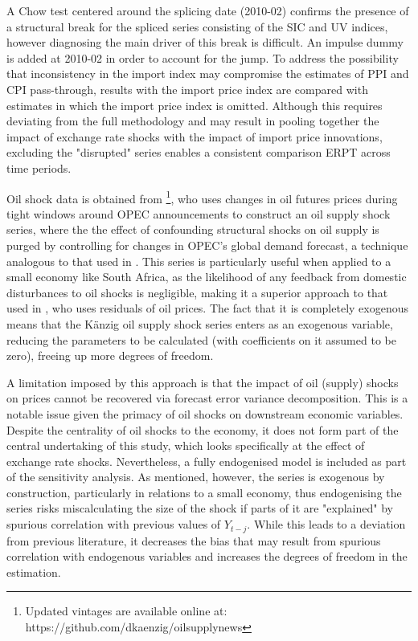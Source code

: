 \documentclass[12pt]{article}
\begin{document}
  A Chow test centered around the splicing date (2010-02) confirms the presence of a structural break for the spliced series consisting of the SIC and UV indices, however diagnosing the main driver of this break is difficult. An impulse dummy is added at 2010-02 in order to account for the jump. To address the possibility that inconsistency in the import index may compromise the estimates of PPI and CPI pass-through, results with the import price index are compared with estimates in which the import price index is omitted. Although this requires deviating from the full methodology and may result in pooling together the impact of exchange rate shocks with the impact of import price innovations, excluding the "disrupted" series enables a consistent comparison ERPT across time periods. 

 Oil shock data is obtained from \textcite{Kanzig}\footnote{Updated vintages are available online at: https://github.com/dkaenzig/oilsupplynews}, who uses changes in oil futures prices during tight windows around OPEC announcements to construct an oil supply shock series, where the the effect of confounding structural shocks on oil supply is purged by controlling for changes in OPEC's global demand forecast, a technique analogous to that used in \textcite{romer_romer}. This series is particularly useful when applied to a small economy like South Africa, as the likelihood of any feedback from domestic disturbances to oil shocks is negligible, making it a superior approach to that used in \textcite{mccarthy1999}, who uses residuals of oil prices. The fact that it is completely exogenous means that the K\"anzig oil supply shock series enters as an exogenous variable, reducing the parameters to be calculated (with coefficients on it assumed to be zero), freeing up more degrees of freedom. 

 A limitation imposed by this approach is that the impact of oil (supply) shocks on prices cannot be recovered via forecast error variance decomposition. This is a notable issue given the primacy of oil shocks on downstream economic variables. Despite the centrality of oil shocks to the economy, it does not form part of the central undertaking of this study, which looks specifically at the effect of exchange rate shocks. Nevertheless, a fully endogenised model is included as part of the sensitivity analysis. As mentioned, however, the series is exogenous by construction, particularly in relations to a small economy, thus endogenising the series risks miscalculating the size of the shock if parts of it are "explained" by spurious correlation with previous values of $Y_{t-j}$. While this leads to a deviation from previous literature, it decreases the bias that may result from spurious correlation with endogenous variables and increases the degrees of freedom in the estimation. 
\end{document}
